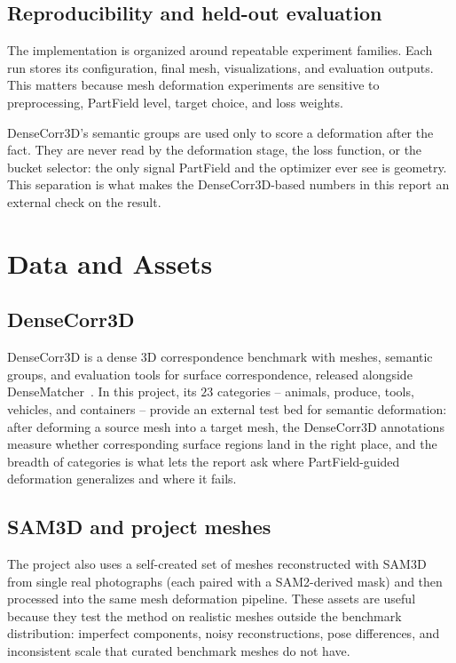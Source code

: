 \documentclass{article}
\begin{document}
\subsection{Reproducibility and held-out evaluation}

The implementation is organized around repeatable experiment families. Each run stores its
configuration, final mesh, visualizations, and evaluation outputs. This matters because mesh
deformation experiments are sensitive to preprocessing, PartField level, target choice, and loss
weights.

DenseCorr3D's semantic groups are used only to score a deformation after the fact. They are never
read by the deformation stage, the loss function, or the bucket selector: the only signal PartField
and the optimizer ever see is geometry. This separation is what makes the DenseCorr3D-based numbers
in this report an external check on the result.

\section{Data and Assets}
\label{sec:data-assets}

\subsection{DenseCorr3D}

DenseCorr3D is a dense 3D correspondence benchmark with meshes, semantic groups, and evaluation
tools for surface correspondence, released alongside DenseMatcher~\cite{densematcher}. In this
project, its $23$ categories -- animals, produce, tools, vehicles, and containers -- provide an
external test bed for semantic deformation: after deforming a source mesh into a target mesh, the
DenseCorr3D annotations measure whether corresponding surface regions land in the right place, and
the breadth of categories is what lets the report ask where PartField-guided deformation
generalizes and where it fails.

\subsection{SAM3D and project meshes}

The project also uses a self-created set of meshes reconstructed with SAM3D~\cite{sam3d} from
single real photographs (each paired with a SAM2-derived mask) and then processed into the same
mesh deformation pipeline. These assets are useful because they test the method on realistic
meshes outside the benchmark distribution: imperfect components, noisy reconstructions, pose
differences, and inconsistent scale that curated benchmark meshes do not have.
\end{document}

